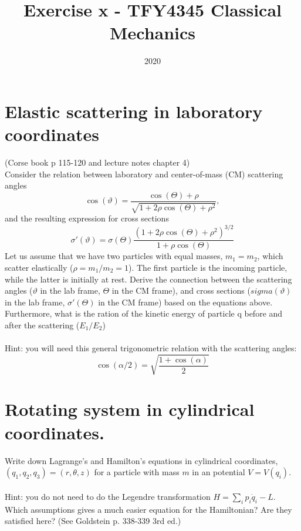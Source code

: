\documentclass{article}
\title{Exercise x - TFY4345 Classical Mechanics}
\date{2020}
\begin{document}
    \maketitle

    \section{Elastic scattering in laboratory coordinates}
    (Corse book p 115-120 and lecture notes chapter 4)\\
    Consider the relation between laboratory and center-of-mass (CM) scattering angles
    \begin{equation}
        \cos(\vartheta) = \frac{\cos(\Theta) + \rho}{\sqrt{1 + 2\rho \cos(\Theta) + \rho^2}},
    \end{equation}
    and the resulting expression for cross sections 
    \begin{equation}
        \sigma'(\vartheta) = \sigma (\Theta) \frac{(1 + 2\rho \cos(\Theta) + \rho^2)^{3/2}}{1 + \rho \cos(\Theta)}
    \end{equation}
    Let us assume that we have two particles with equal masses, $m_1 = m_2$, which scatter elastically ($\rho = m_1/m_2 = 1$). The first particle is the incoming particle, while the latter is initially at rest. Derive the connection between the scattering angles ($\vartheta$ in the lab frame, $\Theta$ in the CM frame), and cross sections ($sigma(\vartheta)$ in the lab frame, $\sigma'(\Theta)$ in the CM frame) based on the equations above. Furthermore, what is the ration of the kinetic energy of particle q before and after the scattering ($E_1 / E_2$)
    \\
    \\
    Hint: you will need this general trigonometric relation with the scattering angles:
    \begin{equation}
        \cos(\alpha/2) = \sqrt{\frac{1 + \cos(\alpha)}{2}}
    \end{equation}

    \section{Rotating system in cylindrical coordinates.}
    Write down Lagrange's and Hamilton's equations in cylindrical coordinates, $(q_1, q_2, q_3) = (r, \theta, z)$ for a particle with mass $m$ in an potential $V = V(q_    i)$.
    \\
    \\
    Hint: you do not need to do the Legendre transformation $H = \sum_i p_i \dot q_i - L$. Which assumptions gives a much easier equation for the Hamiltonian? Are they satisfied here? (See Goldstein p. 338-339 3rd ed.)
\end{document}
